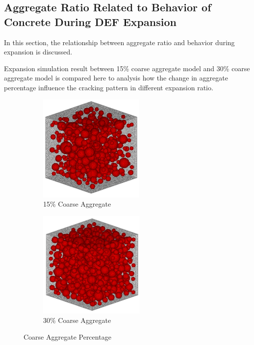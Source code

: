 \clearpage
\subsection{Aggregate Ratio Related to Behavior of Concrete During DEF Expansion}
In this section, the relationship between aggregate ratio and behavior during expansion is discussed.

Expansion simulation result between 15\% coarse aggregate model and 30\% coarse aggregate model is compared here to analysis how the change in aggregate percentage influence the cracking pattern in different expansion ratio.

\begin{figure}[!h]
\centering
\begin{subfigure}{.5\textwidth}
  \centering
  \includegraphics[width=.4\linewidth]{Files/Aggregate/A15.png}
  \caption{15\% Coarse Aggregate}
  \label{fig:A15_model}
\end{subfigure}%
\begin{subfigure}{.5\textwidth}
  \centering
  \includegraphics[width=.4\linewidth]{Files/Aggregate/A30.png}
  \caption{30\% Coarse Aggregate}
  \label{fig:A15_model}
\end{subfigure}
\caption{Coarse Aggregate Percentage}
\label{fig:Aggregate_Percentage}
\end{figure}


